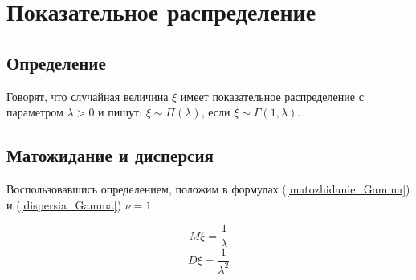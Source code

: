 \section{Показательное распределение}

\subsection{Определение}
Говорят, что случайная величина $\xi$ имеет показательное распределение с параметром $\lambda>0$ и пишут: $\xi \sim \Pi(\lambda)$, если $\xi \sim \Gamma(1,\lambda)$.

\subsection{Матожидание и дисперсия}
Воспользовавшись определением, положим в формулах (\ref{matozhidanie_Gamma}) и (\ref{dispersia_Gamma}) $\nu=1$:

\begin{equation}
M\xi = 
\frac{1}{\lambda }
\end{equation}
\begin{equation}
D\xi = 
\frac{1}{\lambda^2 }
\end{equation}

